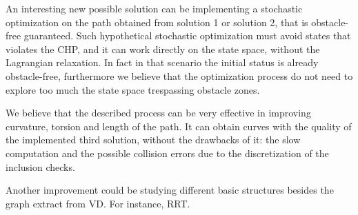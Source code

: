 \documentclass[dissertation.tex]{subfiles}
\begin{document}
An interesting new possible solution can be implementing a
stochastic optimization on the path obtained from solution 1 or
solution 2, that is obstacle-free guaranteed. Such hypothetical stochastic
optimization must avoid states that violates the \acf{CHP}, and it can
work directly on the state space, without the Lagrangian
relaxation. In fact in that scenario the initial status is already
obstacle-free, furthermore we believe that the optimization process do
not need to explore too much the state space trespassing obstacle
zones.

We believe that the described process can be very effective in
improving curvature, torsion and length of the path. It can obtain
curves with the quality of the implemented third solution, without the
drawbacks of it: the slow computation and the possible collision
errors due to the discretization of the inclusion checks.

Another improvement could be studying different basic structures
besides the graph extract from \acf{VD}. For instance, \acf{RRT}.
\end{document}

